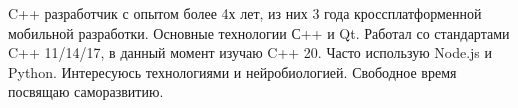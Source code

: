 

\begin{cvparagraph}

C++ разработчик с опытом более 4х лет, из них 3 года кроссплатформенной мобильной разработки. Основные технологии С++ и Qt.
Работал со стандартами C++ 11/14/17, в данный момент изучаю C++ 20. Часто использую Node.js и Python.
Интересуюсь технологиями и нейробиологией. Свободное время посвящаю саморазвитию.
\end{cvparagraph}
